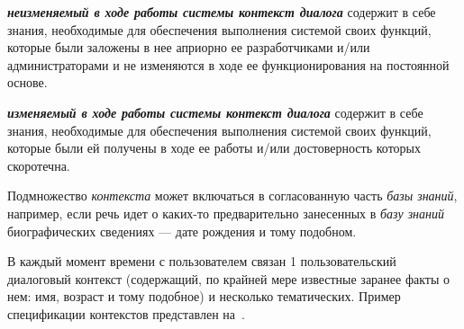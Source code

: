 \textbf{\textit{неизменяемый в ходе работы системы контекст диалога}} содержит в себе знания, необходимые для обеспечения выполнения системой своих функций,  которые были заложены в нее априорно ее разработчиками и/или администраторами и не изменяются в ходе ее функционирования на постоянной основе.

\textbf{\textit{изменяемый в ходе работы системы контекст диалога}} содержит в себе знания, необходимые для обеспечения выполнения системой своих функций,  которые были ей получены в ходе ее работы и/или достоверность которых скоротечна.

\begin{SCn}


    \begin{scnindent}
        \begin{scneqtoset}
        \end{scneqtoset}
    \end{scnindent}
    \begin{scnindent}
        \begin{scneqtoset}
        \end{scneqtoset}
    \end{scnindent}

\end{SCn}

Подмножество \textit{контекста} может включаться в согласованную часть \textit{базы знаний}, например, если речь идет о каких-то предварительно занесенных в \textit{базу знаний} биографических сведениях --- дате рождения и тому подобном.

В каждый момент времени с пользователем связан 1 пользовательский диалоговый контекст (содержащий, по крайней мере известные заранее факты о нем: имя, возраст и тому подобное) и несколько тематических.
Пример спецификации контекстов представлен на~\textit{}.

